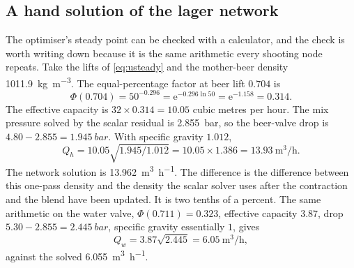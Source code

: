 \subsection{A hand solution of the lager network}
\label{sec:hand}

The optimiser's steady point can be checked with a calculator, and the check is worth writing down because it is the same arithmetic every shooting node repeats. Take the lifts of \eqref{eq:usteady} and the mother-beer density \SI{1011.9}{\kilogram\per\cubic\metre}. The equal-percentage factor at beer lift $0.704$ is
\begin{equation}
\Phi(0.704) = 50^{-0.296} = \mathrm{e}^{-0.296\ln 50} = \mathrm{e}^{-1.158} = 0.314.
\end{equation}
The effective capacity is $32\times 0.314 = 10.05$ cubic metres per hour. The mix pressure solved by the scalar residual is \SI{2.855}{bar}, so the beer-valve drop is $4.80-2.855=\SI{1.945}{bar}$. With specific gravity $1.012$,
\begin{equation}
Q_h = 10.05\sqrt{1.945/1.012} = 10.05\times 1.386 = \SI{13.93}{\cubic\metre\per\hour}.
\end{equation}
The network solution is \SI{13.962}{\cubic\metre\per\hour}. The difference is the difference between this one-pass density and the density the scalar solver uses after the contraction and the blend have been updated. It is two tenths of a percent. The same arithmetic on the water valve, $\Phi(0.711)=0.323$, effective capacity $3.87$, drop $5.30-2.855=\SI{2.445}{bar}$, specific gravity essentially $1$, gives
\begin{equation}
Q_w = 3.87\sqrt{2.445} = \SI{6.05}{\cubic\metre\per\hour},
\end{equation}
against the solved \SI{6.055}{\cubic\metre\per\hour}.

